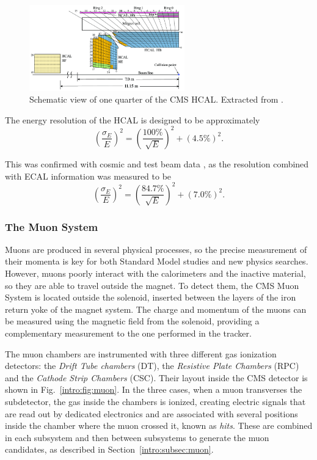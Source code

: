 \documentclass[../main.tex]{subfiles}
\begin{document}
\begin{figure}[h!]
\begin{center}
\includegraphics[width=0.6\textwidth]{Images/hcal}
\end{center}
\caption{Schematic view of one quarter of the CMS HCAL. Extracted from \cite{intro:exp:hcal}.}
\label{intro:fig:hcal}
\end{figure}

The energy resolution of the HCAL is designed to be approximately
\begin{equation}
\left(\frac{\sigma_E}{E}\right)^2 = \left(\frac{100\%}{\sqrt{E}}\right)^2 + (4.5\%)^2.
\end{equation}

This was confirmed with cosmic and test beam data \cite{intro:exp:hcal_res}, as the resolution combined with ECAL information was measured to be
\begin{equation}
\left(\frac{\sigma_E}{E}\right)^2 = \left(\frac{84.7\%}{\sqrt{E}}\right)^2 + (7.0\%)^2.
\end{equation}

\subsubsection{The Muon System}
\label{intro:sec:subdet_muon}

Muons are produced in several physical processes, so the precise measurement of their momenta is key for both Standard Model studies and new physics searches. However, muons poorly interact with the calorimeters and the inactive material, so they are able to travel outside the magnet. To detect them, the CMS Muon System \cite{intro:exp:cms, intro:exp:muon} is located outside the solenoid, inserted between the layers of the iron return yoke of the magnet system. The charge and momentum of the muons can be measured using the magnetic field from the solenoid, providing a complementary measurement to the one performed in the tracker.

The muon chambers are instrumented with three different gas ionization detectors: the \textit{Drift Tube chambers} (DT), the \textit{Resistive Plate Chambers} (RPC) and the \textit{Cathode Strip Chambers} (CSC). Their layout inside the CMS detector is shown in Fig.~\ref{intro:fig:muon}. In the three cases, when a muon transverses the subdetector, the gas inside the chambers is ionized, creating electric signals that are read out by dedicated electronics and are associated with several positions inside the chamber where the muon crossed it, known as \textit{hits}. These are combined in each subsystem and then between subsystems to generate the muon candidates, as described in Section~\ref{intro:subsec:muon}.
\end{document}
